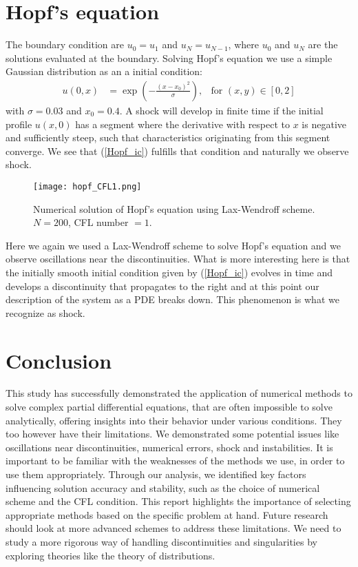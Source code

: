 \documentclass[5p,sort&compress]{elsarticle}
\numberwithin{equation}{subsection}
\begin{document}
\section{Hopf's equation}
The boundary condition are $u_0 = u_1$ and $u_N = u_{N-1}$, where $u_0$ and $u_N$ are the solutions evaluated at the boundary. Solving Hopf's equation we use a simple Gaussian distribution as an a initial condition:
\begin{align}
    u(0, x) &= \exp{\left(-\frac{(x-x_0)^2}{\sigma}\right)}, & \text{for } (x, y) \in [0,2] 
    \label{Hopf_ic}
\end{align}
with $\sigma = 0.03$ and $x_0 = 0.4$. A shock will develop in finite time if the initial profile $u(x,0)$ has a segment where the derivative with respect to $x$ is negative and sufficiently steep, such that characteristics originating from this segment converge. We see that (\ref{Hopf_ic}) fulfills that condition and naturally we observe shock.

\begin{figure}[H]
\centering
\texttt{[image: hopf\_CFL1.png]} %
\caption{Numerical solution of Hopf's equation using Lax-Wendroff scheme. $N = 200$, CFL number $= 1$.}
\label{fig:hopf}
\end{figure}
Here we again we used a Lax-Wendroff scheme to solve Hopf's equation and we observe oscillations near the discontinuities. What is more interesting here is that the initially smooth initial condition given by (\ref{Hopf_ic}) evolves in time and develops a discontinuity that propagates to the right and at this point our description of the system as a PDE breaks down. This phenomenon is what we recognize as shock.
\section{Conclusion}
This study has successfully demonstrated the application of numerical methods to solve complex partial differential equations, that are often impossible to solve analytically, offering insights into their behavior under various conditions. They too however have their limitations. We demonstrated some potential issues like oscillations near discontinuities, numerical errors, shock and instabilities. It is important to be familiar with the weaknesses of the methods we use, in order to use them appropriately. Through our analysis, we identified key factors influencing solution accuracy and stability, such as the choice of numerical scheme and the CFL condition. This report highlights the importance of selecting appropriate methods based on the specific problem at hand. Future research should look at more advanced schemes to address these limitations. We need to study a more rigorous way of handling discontinuities and singularities by exploring theories like the theory of distributions.
\end{document}
